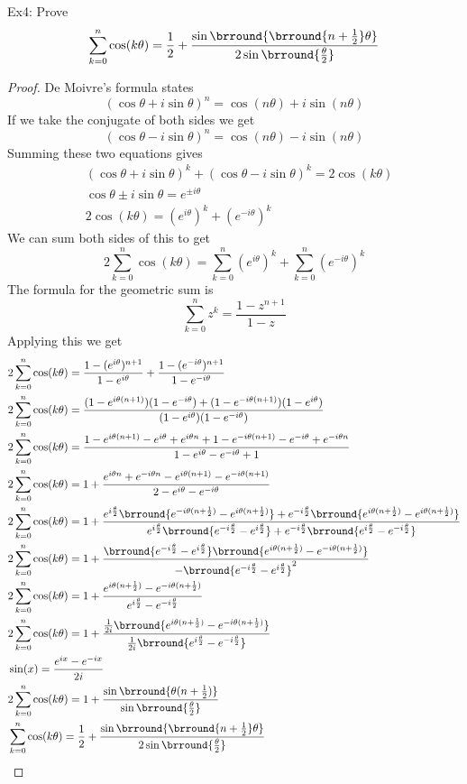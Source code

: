 Ex4: Prove
\[ \sum_{k=0}^n\cos(k\theta)=\frac{1}{2}+\frac{\sin\brround{\brround{n+\frac{1}{2}}\theta}}{2\sin\brround{\frac{\theta}{2}}} \]
\begin{proof}
De Moivre's formula states
\[ (\cos\theta+i\sin\theta)^n=\cos(n\theta)+i\sin(n\theta) \]
If we take the conjugate of both sides we get
\[ (\cos\theta-i\sin\theta)^n=\cos(n\theta)-i\sin(n\theta) \]
Summing these two equations gives
\begin{align*}
    &(\cos\theta+i\sin\theta)^k+(\cos\theta-i\sin\theta)^k=2\cos(k\theta)\\
    &\cos\theta\pm i\sin\theta=e^{\pm i\theta}\\
    &2\cos(k\theta)=(e^{i\theta})^k+(e^{-i\theta})^k
\end{align*}
We can sum both sides of this to get
\[ 2\sum_{k=0}^n\cos(k\theta)=\sum_{k=0}^n(e^{i\theta})^k+\sum_{k=0}^n(e^{-i\theta})^k \]
The formula for the geometric sum is
\[ \sum_{k=0}^n z^k=\frac{1-z^{n+1}}{1-z} \]
Applying this we get
\begin{align*}
    &2\sum_{k=0}^n\cos(k\theta)=\frac{1-(e^{i\theta})^{n+1}}{1-e^{i\theta}}+\frac{1-(e^{-i\theta})^{n+1}}{1-e^{-i\theta}}\\
    &2\sum_{k=0}^n\cos(k\theta)=\frac{(1-e^{i\theta(n+1)})(1-e^{-i\theta})+(1-e^{-i\theta(n+1)})(1-e^{i\theta})}{(1-e^{i\theta})(1-e^{-i\theta})}\\
    &2\sum_{k=0}^n\cos(k\theta)=\frac{1-e^{i\theta(n+1)}-e^{i\theta}+e^{i\theta n}+1-e^{-i\theta(n+1)}-e^{-i\theta}+e^{-i\theta n}}{1-e^{i\theta}-e^{-i\theta}+1}\\
    &2\sum_{k=0}^n\cos(k\theta)=1+\frac{e^{i\theta n}+e^{-i\theta n}-e^{i\theta(n+1)}-e^{-i\theta(n+1)}}{2-e^{i\theta}-e^{-i\theta}}\\
    &2\sum_{k=0}^n\cos(k\theta)=1+\frac{e^{i\frac{\theta}{2}}\brround{e^{-i\theta(n+\frac{1}{2})}-e^{i\theta(n+\frac{1}{2})}}+e^{-i\frac{\theta}{2}}\brround{e^{i\theta(n+\frac{1}{2})}-e^{i\theta(n+\frac{1}{2})}}}{e^{i\frac{\theta}{2}}\brround{e^{-i\frac{\theta}{2}}-e^{i\frac{\theta}{2}}}+e^{-i\frac{\theta}{2}}\brround{e^{i\frac{\theta}{2}}-e^{-i\frac{\theta}{2}}}}\\
    &2\sum_{k=0}^n\cos(k\theta)=1+\frac{\brround{e^{-i\frac{\theta}{2}}-e^{i\frac{\theta}{2}}}\brround{e^{i\theta(n+\frac{1}{2})}-e^{-i\theta(n+\frac{1}{2})}}}{-\brround{e^{-i\frac{\theta}{2}}-e^{i\frac{\theta}{2}}}^2}\\
    &2\sum_{k=0}^n\cos(k\theta)=1+\frac{e^{i\theta(n+\frac{1}{2})}-e^{-i\theta(n+\frac{1}{2})}}{e^{i\frac{\theta}{2}}-e^{-i\frac{\theta}{2}}}\\
    &2\sum_{k=0}^n\cos(k\theta)=1+\frac{\frac{1}{2i}\brround{e^{i\theta(n+\frac{1}{2})}-e^{-i\theta(n+\frac{1}{2})}}}{\frac{1}{2i}\brround{e^{i\frac{\theta}{2}}-e^{-i\frac{\theta}{2}}}}\\
    &\sin(x)=\frac{e^{ix}-e^{-ix}}{2i}\\
    &2\sum_{k=0}^n\cos(k\theta)=1+\frac{\sin\brround{\theta(n+\frac{1}{2})}}{\sin\brround{\frac{\theta}{2}}}\\
    &\sum_{k=0}^n\cos(k\theta)=\frac{1}{2}+\frac{\sin\brround{\brround{n+\frac{1}{2}}\theta}}{2\sin\brround{\frac{\theta}{2}}}
\end{align*}
\end{proof}
